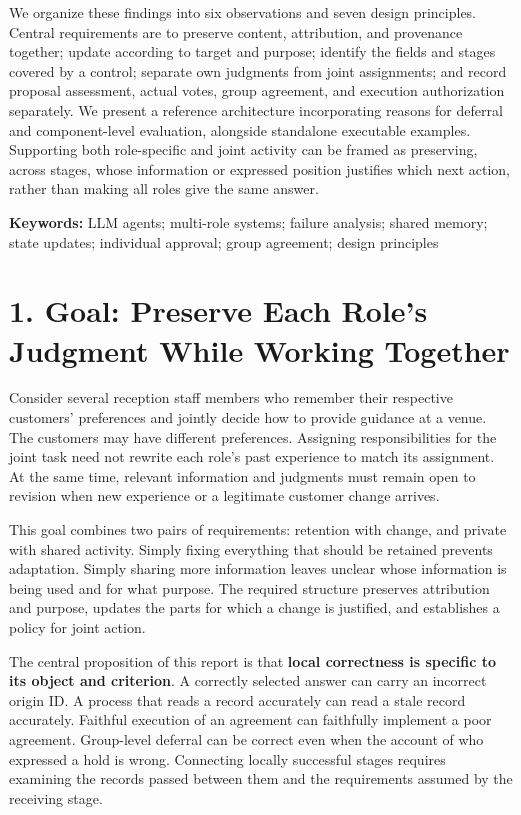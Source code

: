 \documentclass[10pt,a4paper]{article}
\begin{document}
We organize these findings into six observations and seven design principles. Central requirements are to preserve content, attribution, and provenance together; update according to target and purpose; identify the fields and stages covered by a control; separate own judgments from joint assignments; and record proposal assessment, actual votes, group agreement, and execution authorization separately. We present a reference architecture incorporating reasons for deferral and component-level evaluation, alongside standalone executable examples. Supporting both role-specific and joint activity can be framed as preserving, across stages, whose information or expressed position justifies which next action, rather than making all roles give the same answer.

\textbf{Keywords:} LLM agents; multi-role systems; failure analysis; shared memory; state updates; individual approval; group agreement; design principles

\clearpage

\section{1. Goal: Preserve Each Role's Judgment While Working Together}\label{two-role-failure-design-goal-preserve-each-roles-judgment-while-working-together}

Consider several reception staff members who remember their respective customers' preferences and jointly decide how to provide guidance at a venue. The customers may have different preferences. Assigning responsibilities for the joint task need not rewrite each role's past experience to match its assignment. At the same time, relevant information and judgments must remain open to revision when new experience or a legitimate customer change arrives.

This goal combines two pairs of requirements: retention with change, and private with shared activity. Simply fixing everything that should be retained prevents adaptation. Simply sharing more information leaves unclear whose information is being used and for what purpose. The required structure preserves attribution and purpose, updates the parts for which a change is justified, and establishes a policy for joint action.

The central proposition of this report is that \textbf{local correctness is specific to its object and criterion}. A correctly selected answer can carry an incorrect origin ID. A process that reads a record accurately can read a stale record accurately. Faithful execution of an agreement can faithfully implement a poor agreement. Group-level deferral can be correct even when the account of who expressed a hold is wrong. Connecting locally successful stages requires examining the records passed between them and the requirements assumed by the receiving stage.
\end{document}

